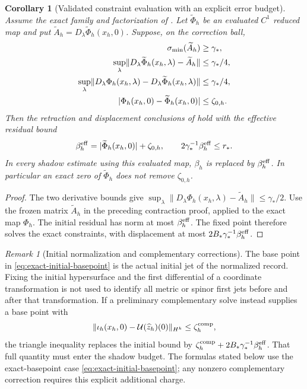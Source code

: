 \documentclass[11pt]{article}
\numberwithin{equation}{section}
\newtheorem{corollary}[corollary]{Corollary}
\theoremstyle{definition}
\theoremstyle{remark}
\newtheorem{remark}[remark]{Remark}
\newcommand{\norm}[1]{\lVert#1\rVert}
\begin{document}
\begin{corollary}[Validated constraint evaluation with an explicit error budget]
\label{cor:validated-initial-retraction}
Assume the exact family and factorization of
. Let $\widetilde\Phi_h$ be an evaluated
$C^1$ reduced map and put
$\widetilde A_h=D_\lambda\widetilde\Phi_h(x_h,0)$.
Suppose, on the correction ball,
\begin{align}
 \sigma_{\min}(\widetilde A_h)&\ge\gamma_*,\notag\\
 \sup_\lambda\norm{D_\lambda\widetilde\Phi_h(x_h,\lambda)
                          -\widetilde A_h}&\le\gamma_*/4,\notag\\
 \sup_\lambda\norm{D_\lambda\Phi_h(x_h,\lambda)
                 -D_\lambda\widetilde\Phi_h(x_h,\lambda)}
                         &\le\gamma_*/4,\notag\\
 |\Phi_h(x_h,0)-\widetilde\Phi_h(x_h,0)|&\le\zeta_{0,h}.
 \label{eq:validated-initial-margins}
\end{align}
Then the retraction and displacement conclusions of
 hold with the effective
residual bound
\begin{equation}
 \beta_h^{\rm eff}=|\widetilde\Phi_h(x_h,0)|+\zeta_{0,h},
 \qquad 2\gamma_*^{-1}\beta_h^{\rm eff}\le r_*.
 \label{eq:validated-initial-budget}
\end{equation}
In every shadow estimate using this evaluated map, $\beta_h$ is replaced
by $\beta_h^{\rm eff}$. In particular an exact zero of
$\widetilde\Phi_h$ does not remove $\zeta_{0,h}$.
\end{corollary}
\begin{proof}
The two derivative bounds give
$\sup_\lambda\norm{D_\lambda\Phi_h(x_h,\lambda)-\widetilde A_h}
\le\gamma_*/2$. Use the frozen matrix $\widetilde A_h$ in the preceding
contraction proof, applied to the exact map $\Phi_h$. The initial residual
has norm at most $\beta_h^{\rm eff}$. The fixed point therefore solves the
exact constraints, with displacement at most
$2B_*\gamma_*^{-1}\beta_h^{\rm eff}$.
\end{proof}

\begin{remark}[Initial normalization and complementary corrections]
\label{rem:initial-correction-bookkeeping}
The base point in \eqref{eq:exact-initial-basepoint} is the actual initial
jet of the normalized record. Fixing the initial hypersurface and the first
differential of a coordinate transformation is not used to identify all
metric or spinor first jets before and after that transformation.
If a preliminary complementary solve instead supplies a base point with
\[
 \norm{\iota_h(x_h,0)-\mathcal U(\widehat z_h)(0)}_{H^k}
       \le\zeta_h^{\rm comp},
\]
the triangle inequality replaces the initial bound by
$\zeta_h^{\rm comp}+2B_*\gamma_*^{-1}\beta_h^{\rm eff}$.
That full quantity must enter the shadow budget. The formulas stated below
use the exact-basepoint case \eqref{eq:exact-initial-basepoint}; any
nonzero complementary correction requires this explicit additional charge.
\end{remark}
\end{document}
